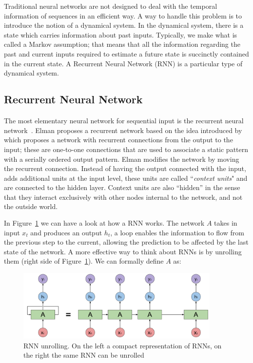Traditional neural networks are not designed to deal with the temporal information of sequences in an efficient way. A way to handle this problem is to introduce the notion of a dynamical system. In the dynamical system, there is a state which carries information about past inputs. Typically, we make what is called a Markov assumption; that means that all the information regarding the past and current inputs required to estimate a future state is succinctly contained in the current state. A Recurrent Neural Network (RNN) is a particular type of dynamical system.

\subsection{Recurrent Neural Network}
\paragraph{}
The most elementary neural network for sequential input is the recurrent neural network~\citep{elman1990finding}. Elman proposes a recurrent network based on the idea introduced by~\citet{jordan1986} which proposes a network with recurrent connections from the output to the input; these are one-to-one connections that are used to associate a static pattern with a serially ordered output pattern. Elman modifies the network by moving the recurrent connection. Instead of having the output connected with the input, \cite{elman1990finding} adds additional units at the input level, these units are called ``\textit{context units}" and are connected to the hidden layer. Context units are also “hidden” in the sense that they interact exclusively with other nodes internal to the network, and not the outside world. 

In Figure~\ref{fig:rnn} we can have a look at how a RNN works. The network $A$ takes in input $x_t$ and produces an output $h_t$, a loop enables the information to flow from the previous step to the current, allowing the prediction to be affected by the last state of the network. A more effective way to think about RNNs is by unrolling them (right side of Figure~\ref{fig:rnn}). We can formally define $A$ as:

\begin{figure}[t]
        \centering
        \includegraphics[width=0.9\textwidth]{images/RNN.pdf}
        \caption{RNN unrolling. On the left a compact representation of RNNs, on the right the same RNN can be unrolled}
        \label{fig:rnn}
\end{figure}%

